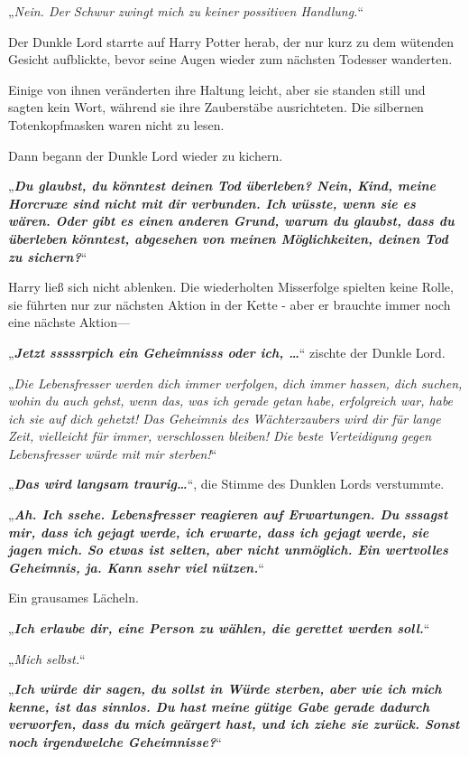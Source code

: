 {„\emph{Nein. Der Schwur zwingt mich zu keiner possitiven Handlung.}“

Der Dunkle Lord starrte auf Harry Potter herab, der nur kurz zu dem wütenden Gesicht aufblickte, bevor seine Augen wieder zum nächsten Todesser wanderten.

Einige von ihnen veränderten ihre Haltung leicht, aber sie standen still und sagten kein Wort, während sie ihre Zauberstäbe ausrichteten. Die silbernen Totenkopfmasken waren nicht zu lesen.

Dann begann der Dunkle Lord wieder zu kichern.

„\textbf{\emph{Du glaubst, du könntest deinen Tod überleben? Nein, Kind, meine Horcruxe sind nicht mit dir verbunden. Ich wüsste, wenn sie es wären. Oder gibt es einen anderen Grund, warum du glaubst, dass du überleben könntest, abgesehen von meinen Möglichkeiten, deinen Tod zu sichern?}}“

Harry ließ sich nicht ablenken. Die wiederholten Misserfolge spielten keine Rolle, sie führten nur zur nächsten Aktion in der Kette - aber er brauchte immer noch eine nächste Aktion—

„\textbf{\emph{Jetzt sssssrpich ein Geheimnisss oder ich, …}}“ zischte der Dunkle Lord.

„\emph{Die Lebensfresser werden dich immer verfolgen, dich immer hassen, dich suchen, wohin du auch gehst, wenn das, was ich gerade getan habe, erfolgreich war, habe ich sie auf dich gehetzt! Das Geheimnis des Wächterzaubers wird dir für lange Zeit, vielleicht für immer, verschlossen bleiben! Die beste Verteidigung gegen Lebensfresser würde mit mir sterben!}“

„\textbf{\emph{Das wird langsam traurig…}}“, die Stimme des Dunklen Lords verstummte.

„\textbf{\emph{Ah. Ich ssehe. Lebensfresser reagieren auf Erwartungen. Du sssagst mir, dass ich gejagt werde, ich erwarte, dass ich gejagt werde, sie jagen mich. So etwas ist selten, aber nicht unmöglich. Ein wertvolles Geheimnis, ja. Kann ssehr viel nützen.}}“

Ein grausames Lächeln.

„\textbf{\emph{Ich erlaube dir, eine Person zu wählen, die gerettet werden soll.}}“

„\emph{Mich selbst.}“

„\textbf{\emph{Ich würde dir sagen, du sollst in Würde sterben, aber wie ich mich kenne, ist das sinnlos. Du hast meine gütige Gabe gerade dadurch verworfen, dass du mich geärgert hast, und ich ziehe sie zurück. Sonst noch irgendwelche Geheimnisse?}}“

}
